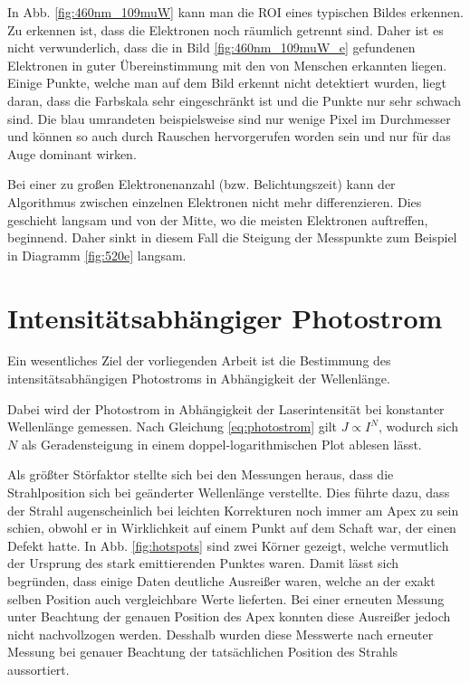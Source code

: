 \documentclass[bachelor,       %
               twoside,        %
               BCOR10mm,       %
               english,ngerman, %
               final,          %
               ]{GAUBM}
\begin{document}
In Abb. \ref{fig:460nm_109muW} kann man die ROI eines typischen Bildes erkennen.
Zu erkennen ist, dass die Elektronen noch räumlich getrennt sind.
Daher ist es nicht verwunderlich, dass die in Bild \ref{fig:460nm_109muW_e} gefundenen Elektronen in guter Übereinstimmung mit den von Menschen erkannten liegen.
Einige Punkte, welche man auf dem Bild erkennt nicht detektiert wurden, liegt daran, dass die Farbskala sehr eingeschränkt ist und die Punkte nur sehr schwach sind.
Die blau umrandeten beispielsweise sind nur wenige Pixel im Durchmesser und können so auch durch Rauschen hervorgerufen worden sein und nur für das Auge dominant wirken.

Bei einer zu großen Elektronenanzahl (bzw. Belichtungszeit) kann der Algorithmus zwischen einzelnen Elektronen nicht mehr differenzieren.
Dies geschieht langsam und von der Mitte, wo die meisten Elektronen auftreffen, beginnend.
Daher sinkt in diesem Fall die Steigung der Messpunkte zum Beispiel in Diagramm \ref{fig:520e} langsam.





\section{Intensitätsabhängiger Photostrom}
Ein wesentliches Ziel der vorliegenden Arbeit ist die Bestimmung des intensitätsabhängigen Photostroms in Abhängigkeit der Wellenlänge.

Dabei wird der Photostrom in Abhängigkeit der Laserintensität bei konstanter Wellenlänge gemessen.
Nach Gleichung \ref{eq:photostrom} gilt $J\propto I^N$, wodurch sich $N$ als Geradensteigung in einem doppel-logarithmischen Plot ablesen lässt.

Als größter Störfaktor stellte sich bei den Messungen heraus, dass die Strahlposition sich bei geänderter Wellenlänge verstellte.
Dies führte dazu, dass der Strahl augenscheinlich bei leichten Korrekturen noch immer am Apex zu sein schien, obwohl er in Wirklichkeit auf einem Punkt auf dem Schaft war, der einen Defekt hatte.
In Abb. \ref{fig:hotspots} sind zwei Körner gezeigt, welche vermutlich der Ursprung des stark emittierenden Punktes waren.
Damit lässt sich begründen, dass einige Daten deutliche Ausreißer waren, welche an der exakt selben Position auch vergleichbare Werte lieferten.
Bei einer erneuten Messung unter Beachtung der genauen Position des Apex konnten diese Ausreißer jedoch nicht nachvollzogen werden.
Desshalb wurden diese Messwerte nach erneuter Messung bei genauer Beachtung der tatsächlichen Position des Strahls aussortiert.
\end{document}
